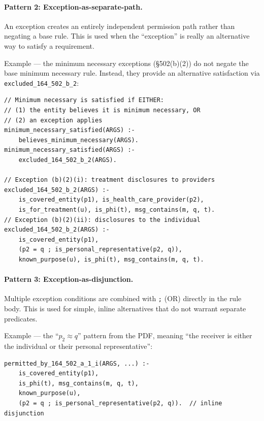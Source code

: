 \documentclass[11pt,letterpaper]{article}
\begin{document}
\paragraph{Pattern 2: Exception-as-separate-path.} An exception creates an entirely independent permission path rather than negating a base rule. This is used when the ``exception'' is really an alternative way to satisfy a requirement.

Example --- the minimum necessary exceptions (\S 502(b)(2)) do not negate the base minimum necessary rule. Instead, they provide an alternative satisfaction via \texttt{excluded\_164\_502\_b\_2}:

\begin{lstlisting}[style=soufflestyle,caption={Exception-as-separate-path pattern (from hipaa\_164\_502.dl)}]
// Minimum necessary is satisfied if EITHER:
// (1) the entity believes it is minimum necessary, OR
// (2) an exception applies
minimum_necessary_satisfied(ARGS) :-
    believes_minimum_necessary(ARGS).
minimum_necessary_satisfied(ARGS) :-
    excluded_164_502_b_2(ARGS).

// Exception (b)(2)(i): treatment disclosures to providers
excluded_164_502_b_2(ARGS) :-
    is_covered_entity(p1), is_health_care_provider(p2),
    is_for_treatment(u), is_phi(t), msg_contains(m, q, t).
// Exception (b)(2)(ii): disclosures to the individual
excluded_164_502_b_2(ARGS) :-
    is_covered_entity(p1),
    (p2 = q ; is_personal_representative(p2, q)),
    known_purpose(u), is_phi(t), msg_contains(m, q, t).
\end{lstlisting}

\paragraph{Pattern 3: Exception-as-disjunction.} Multiple exception conditions are combined with \texttt{;} (OR) directly in the rule body. This is used for simple, inline alternatives that do not warrant separate predicates.

Example --- the ``$p_2 \approx q$'' pattern from the PDF, meaning ``the receiver is either the individual or their personal representative'':

\begin{lstlisting}[style=soufflestyle,caption={Exception-as-disjunction pattern (from hipaa\_164\_502.dl)}]
permitted_by_164_502_a_1_i(ARGS, ...) :-
    is_covered_entity(p1),
    is_phi(t), msg_contains(m, q, t),
    known_purpose(u),
    (p2 = q ; is_personal_representative(p2, q)).  // inline disjunction
\end{lstlisting}
\end{document}
